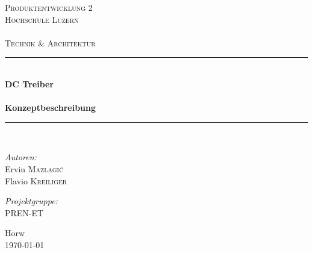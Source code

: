 \begin{titlepage}

\begin{center}

\textsc{\LARGE Produktentwicklung 2}\\[1.5cm]

\textsc{\Large Hochschule Luzern\\
    ~\\
    Technik \& Architektur}\\[0.5cm]

\vfill{}

\newcommand{\HRule}{\rule{\linewidth}{0.5mm}}
\HRule \\[0.4cm]
{   \Huge \bfseries DC Treiber\\
        ~\\
        \large Konzeptbeschreibung}\\[0.4cm]

\HRule \\[1.5cm]

\begin{minipage}[t]{0.4\textwidth}
    \begin{flushleft} \large
        \emph{Autoren:}\\
        Ervin \textsc{Mazlagi\'c}\\
        Flavio \textsc{Kreiliger}\\
    \end{flushleft}
\end{minipage}
\hfill
\begin{minipage}[t]{0.4\textwidth}
    \begin{flushright} \large
        \emph{Projektgruppe:} \\
        PREN-ET
    \end{flushright}
\end{minipage}

\vfill{}
\vfill{}
\vfill{}

{\large Horw\\ \today}

\end{center}

\end{titlepage}

